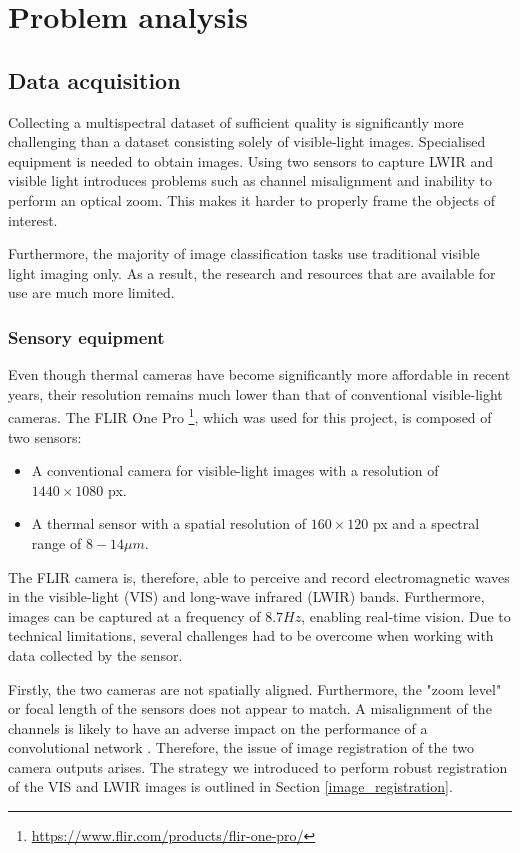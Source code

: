 \documentclass{l4proj}
\begin{document}
\chapter{Problem analysis}

\section{Data acquisition}

Collecting a multispectral dataset of sufficient quality is significantly more challenging than a dataset consisting solely of visible-light images. Specialised equipment is needed to obtain images. Using two sensors to capture LWIR and visible light introduces problems such as channel misalignment and inability to perform an optical zoom. This makes it harder to properly frame the objects of interest.

Furthermore, the majority of image classification tasks use traditional visible light imaging only. As a result, the research and resources that are available for use are much more limited.

\subsection{Sensory equipment}

Even though thermal cameras have become significantly more affordable in recent years, their resolution remains much lower than that of conventional visible-light cameras. The FLIR One Pro \footnote{\url{https://www.flir.com/products/flir-one-pro/}}, which was used for this project, is composed of two sensors:

\begin{itemize}
  \item A conventional camera for visible-light images with a resolution of $1440 \times 1080$ px.
  \item A thermal sensor with a spatial resolution of $160 \times 120$ px and a spectral range of $8 - 14 \mu m$.
\end{itemize}

The FLIR camera is, therefore, able to perceive and record electromagnetic waves in the visible-light (VIS) and long-wave infrared (LWIR) bands. Furthermore, images can be captured at a frequency of $8.7 Hz$, enabling real-time vision. Due to technical limitations, several challenges had to be overcome when working with data collected by the sensor.

Firstly, the two cameras are not spatially aligned. Furthermore, the "zoom level" or focal length of the sensors does not appear to match. A misalignment of the channels is likely to have an adverse impact on the performance of a convolutional network \citep{chappelow_improving_2008}. Therefore, the issue of image registration of the two camera outputs arises. The strategy we introduced to perform robust registration of the VIS and LWIR images is outlined in Section \ref{image_registration}.
\end{document}
